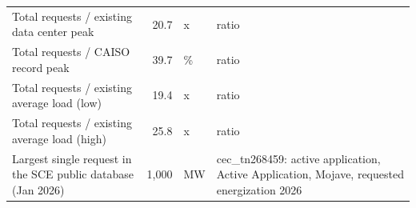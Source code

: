 \begin{tabular}{p{6.2cm}rlp{7.2cm}}
Total requests / existing data center peak & 20.7 & x & ratio \\
Total requests / CAISO record peak & 39.7 & \% & ratio \\
Total requests / existing average load (low) & 19.4 & x & ratio \\
Total requests / existing average load (high) & 25.8 & x & ratio \\
Largest single request in the SCE public database (Jan 2026) & 1,000 & MW & cec\_\allowbreak{}tn268459: active application, Active Application, Mojave, requested energization 2026 \\
\bottomrule
\end{tabular}